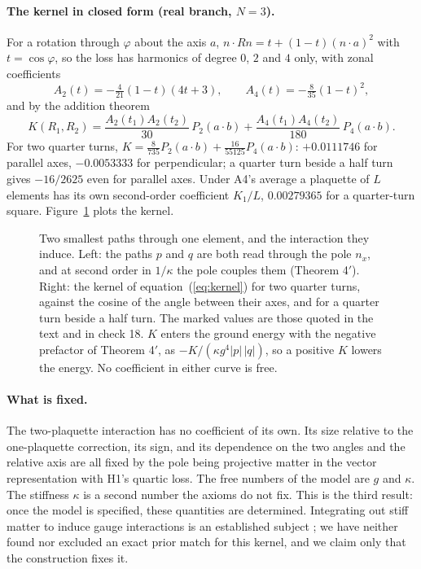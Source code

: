 \documentclass[11pt,a4paper]{article}
\theoremstyle{plain}
\theoremstyle{definition}
\theoremstyle{remark}
\begin{document}
\paragraph{The kernel in closed form (real branch, $N=3$).} For a rotation through $\varphi$ about the axis $a$, $n\cdot Rn=t+(1-t)(n\cdot a)^2$ with $t=\cos\varphi$, so the loss has harmonics of degree $0$, $2$ and $4$ only, with zonal coefficients
\begin{equation}
A_2(t)=-\tfrac{4}{21}(1-t)(4t+3),\qquad A_4(t)=-\tfrac{8}{35}(1-t)^2,
\end{equation}
and by the addition theorem
\begin{equation}\label{eq:kernel}
K(R_1,R_2)=\frac{A_2(t_1)A_2(t_2)}{30}\,P_2(a\cdot b)+\frac{A_4(t_1)A_4(t_2)}{180}\,P_4(a\cdot b).
\end{equation}
For two quarter turns, $K=\tfrac{8}{735}P_2(a\cdot b)+\tfrac{16}{55125}P_4(a\cdot b)$: $+0.0111746$ for parallel axes, $-0.0053333$ for perpendicular; a quarter turn beside a half turn gives $-16/2625$ even for parallel axes. Under A4's average a plaquette of $L$ elements has its own second-order coefficient $K_1/L$, $0.00279365$ for a quarter-turn square. Figure~\ref{fig:kernel} plots the kernel.

\begin{figure}[!htbp]
\centering

\caption{Two smallest paths through one element, and the interaction they induce. Left: the paths $p$ and $q$ are both read through the pole $n_x$, and at second order in $1/\kappa$ the pole couples them (Theorem 4$'$). Right: the kernel of equation~(\ref{eq:kernel}) for two quarter turns, against the cosine of the angle between their axes, and for a quarter turn beside a half turn. The marked values are those quoted in the text and in check 18. $K$ enters the ground energy with the negative prefactor of Theorem 4$'$, as $-K/(\kappa g^4|p|\,|q|)$, so a positive $K$ lowers the energy. No coefficient in either curve is free.}
\label{fig:kernel}
\end{figure}

\paragraph{What is fixed.} The two-plaquette interaction has no coefficient of its own. Its size relative to the one-plaquette correction, its sign, and its dependence on the two angles and the relative axis are all fixed by the pole being projective matter in the vector representation with H1's quartic loss. The free numbers of the model are $g$ and $\kappa$. The stiffness $\kappa$ is a second number the axioms do not fix. This is the third result: once the model is specified, these quantities are determined. Integrating out stiff matter to induce gauge interactions is an established subject \cite{km,ps}; we have neither found nor excluded an exact prior match for this kernel, and we claim only that the construction fixes it.
\end{document}
